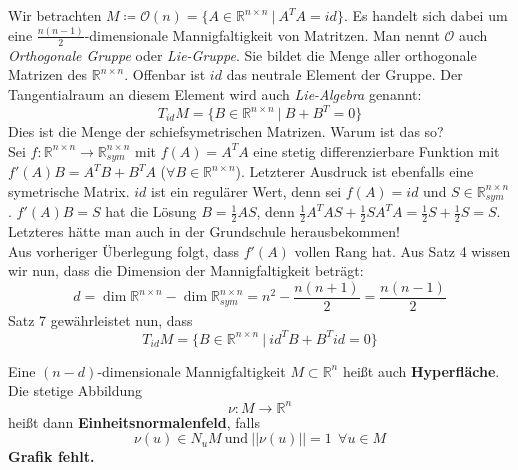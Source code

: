 \begin{beispiel}
Wir betrachten $M\coloneqq\mathcal{O}(n)=\{A\in\mathbb{R}^{n\times n}\ |\ A^TA=id \}$. 
Es handelt sich dabei um eine $\frac{n(n-1)}{2}$-dimensionale Mannigfaltigkeit von Matritzen. 
Man nennt $\mathcal{O}$ auch \emph{Orthogonale Gruppe} oder \emph{Lie-Gruppe}. 
Sie bildet die Menge aller orthogonale Matrizen des $\mathbb{R}^{n\times n}$. 
Offenbar ist $id$ das neutrale Element der Gruppe. Der Tangentialraum an diesem Element wird auch \emph{Lie-Algebra} genannt:
\begin{equation*}
T_{id}M=\{B\in\mathbb{R}^{n\times n}\ |\ B+B^T=0\}
\end{equation*}
Dies ist die Menge der schiefsymetrischen Matrizen. Warum ist das so?\\
\linebreak
Sei $f:\mathbb{R}^{n\times n}\rightarrow\mathbb{R}_{sym}^{n\times n}$ mit $f(A)=A^TA$ eine stetig differenzierbare Funktion mit $f'(A)B=A^TB+B^TA$ ($\forall B\in\mathbb{R}^{n\times n}$). Letzterer Ausdruck ist ebenfalls eine symetrische Matrix. 
$id$ ist ein regulärer Wert, denn sei $f(A)=id$ und $S\in\mathbb{R}_{sym}^{n\times n}$. $f'(A)B=S$ hat die Lösung $B=\frac{1}{2}AS$, denn $\frac{1}{2}A^TAS+\frac{1}{2}SA^TA=\frac{1}{2}S+\frac{1}{2}S=S$.
Letzteres hätte man auch in der Grundschule herausbekommen!\\
Aus vorheriger Überlegung folgt, dass $f'(A)$ vollen Rang hat. Aus Satz 4 wissen wir nun, dass die Dimension der Mannigfaltigkeit beträgt:
\begin{equation*}
d=\dim\mathbb{R}^{n\times n}-\dim\mathbb{R}_{sym}^{n\times n}=n^2-\frac{n(n+1)}{2}=\frac{n(n-1)}{2}
\end{equation*}
Satz 7 gewährleistet nun, dass
\begin{equation*}
T_{id}M=\{B\in\mathbb{R}^{n\times n} \ | \ id^TB+B^Tid=0\}
\end{equation*}
\end{beispiel}

\begin{definition}
Eine $(n-d)$-dimensionale Mannigfaltigkeit $M\subset\mathbb{R}^n$ heißt auch \textbf{Hyperfläche}. Die stetige Abbildung
\begin{equation*}
\nu:M\rightarrow\mathbb{R}^{n}
\end{equation*} 
heißt dann \textbf{Einheitsnormalenfeld}, falls 
\begin{equation*}
\nu(u)\in N_uM\ \mathrm{und\ } ||\nu(u)||=1 \ \ \forall u\in M
\end{equation*}
\textbf{Grafik fehlt.}
\end{definition}

